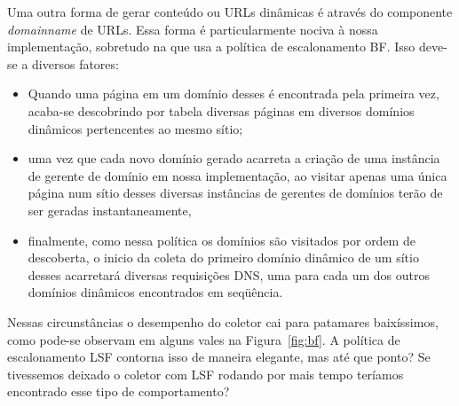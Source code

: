 \documentclass[10pt,twocolumn]{article}
\begin{document}
Uma outra forma de gerar conteúdo ou URLs dinâmicas é através do
componente \emph{domainname} de URLs. Essa forma é particularmente
nociva à nossa implementação, sobretudo na que usa a política de
escalonamento BF. Isso deve-se a diversos fatores:
\begin{itemize}
\item Quando uma página em um domínio desses é encontrada pela primeira
vez, acaba-se descobrindo por tabela diversas páginas em diversos
domínios dinâmicos pertencentes ao mesmo sítio;
\item uma vez que cada novo domínio gerado
acarreta a criação de uma instância de gerente de domínio em nossa
implementação, ao visitar apenas uma única página num sítio desses
diversas instâncias de gerentes de domínios terão de ser geradas
instantaneamente,
\item finalmente,  como nessa política os domínios são visitados por ordem de
descoberta, o inicio da coleta do primeiro domínio dinâmico de um sítio
desses acarretará diversas requisições DNS, uma para cada um dos outros
domínios dinâmicos encontrados em seqüência.
\end{itemize}

Nessas circunstâncias o desempenho do coletor cai para patamares
baixíssimos, como pode-se observam em alguns vales na
Figura~\ref{fig:bf}. A política de escalonamento LSF contorna isso de
maneira elegante, mas até que ponto? Se tivessemos deixado o coletor com
LSF rodando por mais tempo teríamos encontrado esse tipo de
comportamento?

\end{document}
